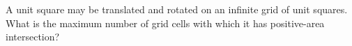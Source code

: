 A unit square may be translated and rotated on an infinite grid of unit squares. What is the maximum number of grid cells with which it has positive-area intersection?
